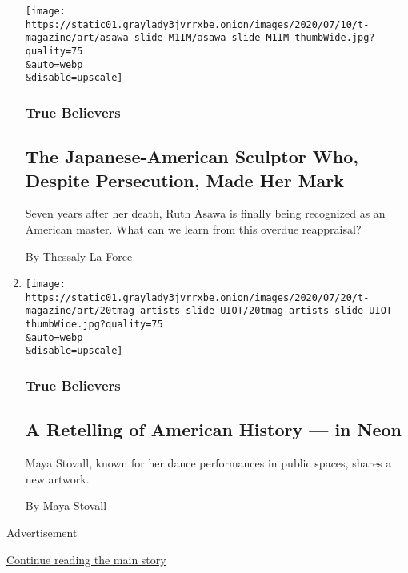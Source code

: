 \begin{enumerate}
  \texttt{[image: https://static01.graylady3jvrrxbe.onion/images/2020/07/10/t-magazine/art/asawa-slide-M1IM/asawa-slide-M1IM-thumbWide.jpg?quality=75\\\&auto=webp\\\&disable=upscale]}

  \hypertarget{true-believers-15}{%
  \subsubsection{True Believers}\label{true-believers-15}}

  \hypertarget{the-japanese-american-sculptor-who-despite-persecution-made-her-mark}{%
  \subsection{The Japanese-American Sculptor Who, Despite Persecution,
  Made Her
  Mark}\label{the-japanese-american-sculptor-who-despite-persecution-made-her-mark}}

  Seven years after her death, Ruth Asawa is finally being recognized as
  an American master. What can we learn from this overdue reappraisal?

  By Thessaly La Force
\item
  \href{/2020/07/20/t-magazine/maya-stovall.html}{}

  \texttt{[image: https://static01.graylady3jvrrxbe.onion/images/2020/07/20/t-magazine/art/20tmag-artists-slide-UIOT/20tmag-artists-slide-UIOT-thumbWide.jpg?quality=75\\\&auto=webp\\\&disable=upscale]}

  \hypertarget{true-believers-16}{%
  \subsubsection{True Believers}\label{true-believers-16}}

  \hypertarget{a-retelling-of-american-history--in-neon}{%
  \subsection{A Retelling of American History --- in
  Neon}\label{a-retelling-of-american-history--in-neon}}

  Maya Stovall, known for her dance performances in public spaces,
  shares a new artwork.

  By Maya Stovall
\end{enumerate}

Advertisement

\protect\hyperlink{after-mid2}{Continue reading the main story}

